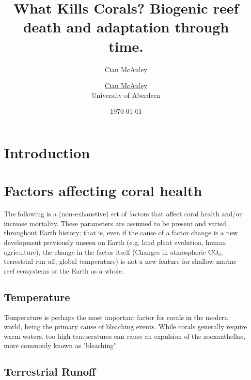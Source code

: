 \documentclass[11pt,a4paper]{article}
\author{Cian McAuley}
\title{What Kills Corals?}
\begin{document}
\begin{center}

\title{
\huge Biogenic reef death and adaptation through time. 
}
\author{\Large \href{mailto:r02cm21@abdn.ac.uk}{Cian McAuley} 
\\University of Aberdeen
}
\date{\today}

\maketitle


\end{center}
\begin{abstract}

\end{abstract}

\section{Introduction}

\section{Factors affecting coral health}



The following is a (non-exhaustive) set of factors that affect coral health and/or increase mortality. These parameters are assumed to be present and varied throughout Earth history; that is, even if the cause of a factor change is a new development previously unseen on Earth (e.g. land plant evolution, human agriculture), the change in the factor itself (Changes in atmospheric CO$_{2}$, terrestrial run off, global temperature) is not a new feature for shallow marine reef ecosystems or the Earth as a whole.

\subsection{Temperature}
Temperature is perhaps the most important factor for corals in the modern world, being the primary cause of bleaching events.
 While corals generally require warm waters, too high temperatures can cause an expulsion of the zooxanthellae, more commonly known as "bleaching".


\subsection{Terrestrial Runoff}
\end{document}
